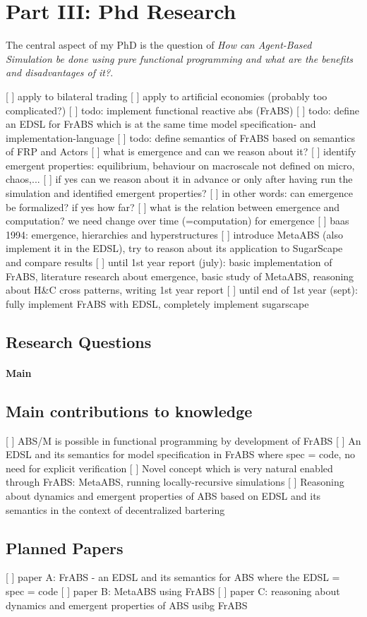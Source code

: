 \section{Part III: Phd Research} 
The central aspect of my PhD is the question of \textit{How can Agent-Based Simulation be done using pure functional programming and what are the benefits and disadvantages of it?}.

[ ] apply to bilateral trading
[ ] apply to artificial economies (probably too complicated?)
[ ] todo: implement functional reactive abs (FrABS)
[ ] todo: define an EDSL for FrABS which is at the same time model specification- and implementation-language
[ ] todo: define semantics of FrABS based on semantics of FRP and Actors
[ ] what is emergence and can we reason about it? 
[ ] identify emergent properties: equilibrium, behaviour on macroscale not defined on micro, chaos,...
[ ] if yes can we reason about it in advance or only after having run the simulation and identified emergent properties?
[ ] in other words: can emergence be formalized? if yes how far?
[ ] what is the relation between emergence and computation? we need change over time (=computation) for emergence
[ ] baas 1994: emergence, hierarchies and hyperstructures
[ ] introduce MetaABS (also implement it in the EDSL), try to reason about its application to SugarScape and compare results
[ ] until 1st year report (july): basic implementation of FrABS, literature research about emergence, basic study of MetaABS, reasoning about H&C cross patterns, writing 1st year report
[ ] until end of 1st year (sept): fully implement FrABS with EDSL, completely implement sugarscape

\subsection{Research Questions}
\paragraph{Main} 

\subsection{Main contributions to knowledge}
[ ] ABS/M is possible in functional programming by development of FrABS
[ ] An EDSL and its semantics for model specification in FrABS where spec = code,  no need for explicit verification
[ ] Novel concept which is very natural enabled through FrABS: MetaABS, running locally-recursive simulations
[ ] Reasoning about  dynamics and emergent properties of ABS based on EDSL and its semantics in the context of decentralized bartering

\subsection{Planned Papers}
[ ] paper A: FrABS - an EDSL and its semantics for ABS where the EDSL = spec = code
[ ] paper B: MetaABS using FrABS
[ ] paper C: reasoning about dynamics and emergent properties of ABS usibg FrABS